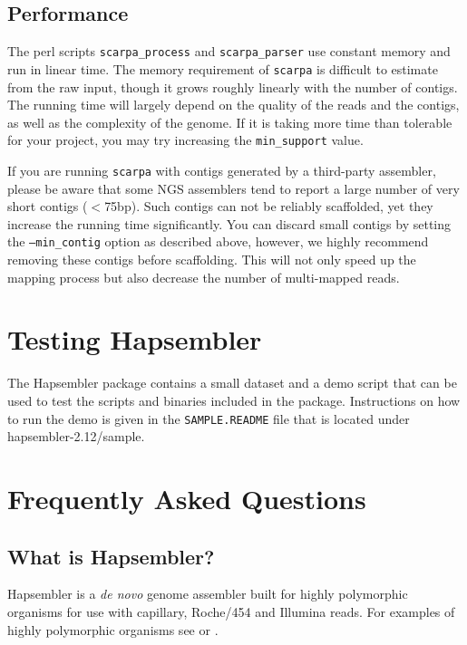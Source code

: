 \documentclass[12pt,a4paper]{report}
\newcommand{\hapversion}{2.12}
\begin{document}
\subsection{Performance}

The perl scripts \texttt{scarpa\_process} and \texttt{scarpa\_parser} use constant memory and run in linear time. The memory requirement of \texttt{scarpa} is difficult to estimate from the raw input, though it grows roughly linearly with the number of contigs. The running time will largely  depend on the quality of the reads and the contigs, as well as the complexity of the genome. If it is taking more time than tolerable for your project, you may try increasing the \texttt{min\_support} value.

If you are running \texttt{scarpa} with contigs generated by a third-party assembler, please be aware that some NGS assemblers tend to report a large number of very short contigs ($<$75bp). Such contigs can not be reliably scaffolded, yet they increase the running time significantly. You can discard small contigs by setting the \texttt{--min\_contig} option as described above, however, we highly recommend removing these contigs before scaffolding. This will not only speed up the mapping process but also decrease the number of multi-mapped reads. 

\section{Testing Hapsembler}

The Hapsembler package contains a small dataset and a demo script that can be used to test the scripts and binaries included in the package. Instructions on how to run the demo is given in the \texttt{SAMPLE.README} file that is located under hapsembler-\hapversion{}/sample.

\section{Frequently Asked Questions}
\label{faq}

\subsection{What is Hapsembler?}

Hapsembler\cite{donmez11} is a \emph{de novo} genome assembler built for highly polymorphic organisms for use with capillary, Roche/454 and Illumina reads. For examples of highly polymorphic organisms see \cite{small2} or \cite{sodergren}.
\end{document}
